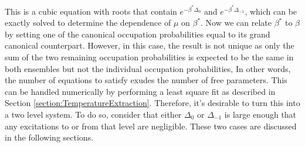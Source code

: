 This is a cubic equation with roots that contain $e^{-\beta^*\Delta_0}$ and $e^{-\beta^*\Delta_{-1}}$, which can be exactly solved to determine the dependence of $\mu$ on $\beta^*$. Now we can relate $\beta^*$ to $\beta$ by setting one of the canonical occupation probabilities equal to its grand canonical counterpart. However, in this case, the result is not unique as only the sum of the two remaining occupation probabilities is expected to be the same in both ensembles but not the individual occupation probabilities, In other words, the number of equations to satisfy exudes the number of free parameters.
This can  be handled numerically by performing a least square fit as described in Section \ref{section:TemperatureExtraction}. %
Therefore, it's desirable to turn this into a two level system. To do so, consider that either $\Delta_0$ or $\Delta_{-1}$ is large enough that any excitations to or from that level are negligible. These two cases are discussed in the following sections. 


